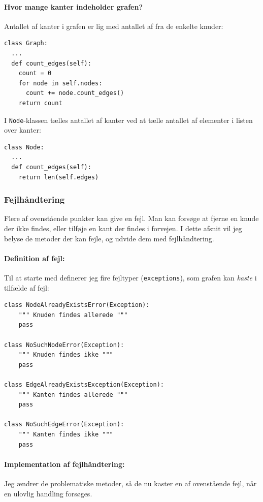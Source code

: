\documentclass[10pt,a4paper,danish]{article}
\newcommand{\ct}{\texttt}
\begin{document}
\paragraph{Hvor mange kanter indeholder grafen?}
Antallet af kanter i grafen er lig med antallet af fra de enkelte
knuder:
{\small
\begin{verbatim}
class Graph:
  ...
  def count_edges(self):
    count = 0
    for node in self.nodes:
      count += node.count_edges()
    return count
\end{verbatim}}

I \ct{Node}-klassen tælles antallet af kanter ved at tælle antallet af
elementer i listen over kanter:
{\small
\begin{verbatim}
class Node:
  ...
  def count_edges(self):
    return len(self.edges)
\end{verbatim}}


\subsubsection{Fejlhåndtering}
Flere af ovenstående punkter kan give en fejl. Man kan forsøge at
fjerne en knude der ikke findes, eller tilføje en kant der findes i
forvejen. I dette afsnit vil jeg belyse de metoder der kan fejle, og
udvide dem med fejlhåndtering.

\paragraph{Definition af fejl:}
Til at starte med definerer jeg fire fejltyper (\ct{exceptions}), som
grafen kan \textit{kaste} i tilfælde af fejl:
{\small
\begin{verbatim}
class NodeAlreadyExistsError(Exception):
    """ Knuden findes allerede """
    pass

class NoSuchNodeError(Exception):
    """ Knuden findes ikke """
    pass

class EdgeAlreadyExistsException(Exception):
    """ Kanten findes allerede """
    pass

class NoSuchEdgeError(Exception):
    """ Kanten findes ikke """
    pass
\end{verbatim}}

\paragraph{Implementation af fejlhåndtering:}
Jeg ændrer de problematiske metoder, så de nu kaster en af
ovenstående fejl, når en ulovlig handling forsøges.\\
\end{document}
